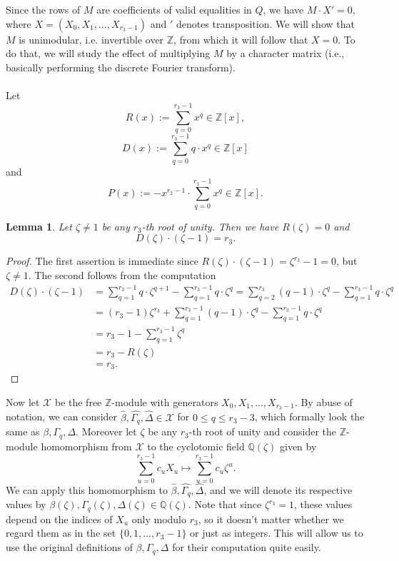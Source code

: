 \documentclass[12pt,a4paper]{article}
\newtheorem{lemma}[theorem]{Lemma}
\theoremstyle{definition}
\newcommand{\Q}{\mathbb{Q}}
\newcommand{\Z}{\mathbb{Z}}
\newcommand{\z}{\zeta}
\begin{document}
Since the rows of $M$ are coefficients of valid equalities in $Q$, we have $M\cdot X'=0$, where $X=(X_0,X_1,\dots,X_{r_3-1})$ and $'$ denotes transposition. We will show that $M$ is unimodular, i.e. invertible over $\Z$, from which it will follow that $X=0$. To do that, we will study the effect of multiplying $M$ by a character matrix (i.e., basically performing the discrete Fourier transform).

\paragraph*{}
Let $$R(x):=\sum_{q=0}^{r_3-1} x^q\in\Z[x],$$
$$D(x):=\sum_{q=0}^{r_3-1}q\cdot x^q\in \Z[x]$$
and 
$$P(x):=-x^{r_2-1}\cdot \sum_{q=0}^{r_1-1} x^q\in \Z[x].$$

\begin{lemma}\label{RD}
Let $\zeta\neq 1$ be any $r_3$-th root of unity. Then we have $R(\zeta)=0$ and $$D(\zeta)\cdot(\zeta-1)=r_3.$$
\end{lemma}
\begin{proof}
The first assertion is immediate since $R(\zeta)\cdot(\zeta-1)=\zeta^{r_3}-1=0$, but $\zeta\neq 1$. The second follows from the computation
\begin{equation*}
\begin{split}
D(\zeta)\cdot(\zeta-1)&=\sum_{q=1}^{r_3-1} q\cdot \zeta^{q+1}-\sum_{q=1}^{r_3-1} q\cdot \zeta^q=\sum_{q=2}^{r_3} (q-1)\cdot \zeta^{q}-\sum_{q=1}^{r_3-1} q\cdot \zeta^q\\
&=(r_3-1)\zeta^{r_3}+\sum_{q=1}^{r_3-1} (q-1)\cdot \zeta^{q}-\sum_{q=1}^{r_3-1} q\cdot \zeta^q\\
&=r_3-1-\sum_{q=1}^{r_3-1} \zeta^{q}\\
&=r_3- R(\zeta)\\
&=r_3.
\end{split}
\end{equation*}
\end{proof}

Now let $\mathcal{X}$ be the free $\Z$-module with generators $X_0,X_1,\dots,X_{r_3-1}$. By abuse of notation, we can consider $\widehat{\beta},\widehat{\Gamma_q},\widehat{\Delta}\in \mathcal{X}$ for $0\leq q\leq r_3-3$, which formally look the same as $\beta,\Gamma_q,\Delta$. Moreover let $\z$ be any $r_3$-th root of unity and consider the $\Z$-module homomorphism from $\mathcal{X}$ to the cyclotomic field $\Q(\z)$ given by $$\sum_{u=0}^{r_3-1}c_u X_u\mapsto \sum_{u=0}^{r_3-1}c_u \z^u.$$ 
We can apply this homomorphism to $\widehat{\beta},\widehat{\Gamma_q},\widehat{\Delta}$, and we will denote its respective values by $\beta(\z),\Gamma_q(\z),\Delta(\z)\in\Q(\z)$. Note that since $\z^{r_3}=1$, these values depend on the indices of $X_u$ only modulo $r_3$, so it doesn't matter whether we regard them as in the set $\{0,1,\dots,r_3-1\}$ or just as integers. This will allow us to use the original definitions of $\beta,\Gamma_q,\Delta$ for their computation quite easily.
\end{document}

